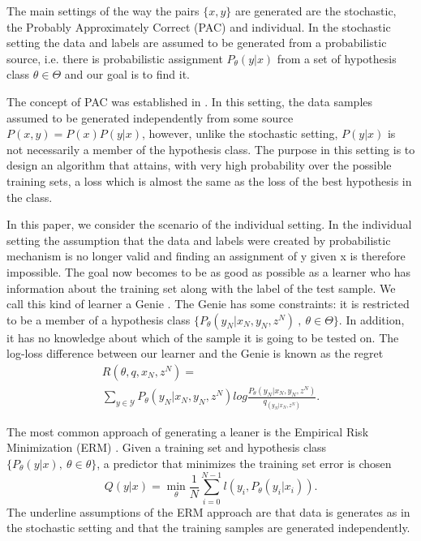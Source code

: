 \documentclass[conference,letterpaper]{IEEEtran}
\begin{document}
The main settings of the way the pairs $\{x,y\}$ are generated are the stochastic, the Probably Approximately Correct (PAC) and individual. 
In the stochastic setting the data and labels are assumed to be generated from a probabilistic source, i.e. there is probabilistic assignment $P_\theta(y|x)$ from a set of hypothesis class $\theta \in \Theta$ and our goal is to find it. 

The concept of PAC was established in  \cite{valiant1984theory}.
In this setting, the data samples assumed to be generated independently from some source $P(x,y)=P(x)P(y|x)$, however, unlike the stochastic setting, $P(y|x)$ is not necessarily a member of the hypothesis class.
The purpose in this setting is to design an algorithm that attains, with very high probability over the possible training sets, a loss which is almost the same as the loss of the best hypothesis in the class. 

In this paper, we consider the scenario of the individual setting. 
In the individual setting the assumption that the data and labels were created by probabilistic mechanism is no longer valid and finding an assignment of y given x is therefore impossible. 
The goal now becomes to be as good as possible as a learner who has information about the training set along with the label of the test sample. 
We call this kind of learner a Genie \cite{feder1992universal}. The Genie has some constraints: it is restricted to be a member of a hypothesis class $\{P_\theta(y_N|x_N,y_N,z^N)\ , \ \theta \in \Theta \}$.  
In addition, it has no knowledge about which of the sample it is going to be tested on. 
The log-loss difference between our learner and the Genie is known as the regret
\begin{multline} \label{eq:genie_regret}
R(\theta, q, x_N, z^N) = \\ \sum_{y \in \mathcal{Y}} P_\theta(y_N|x_N,y_N,z^N) log \frac{P_\theta(y_N|x_N,y_N,z^N)}{q_(y_N|x_N, z^N)}.
\end{multline}

The most common approach of generating a leaner is the Empirical Risk Minimization (ERM) \cite{vapnik1992principles}. 
Given a training set and hypothesis class $\{P_\theta(y|x),\ \theta \in \mathcal{\theta}\}$, a predictor that minimizes the training set error is chosen
\begin{equation}
Q(y|x) = \min_\theta \frac{1}{N}\sum_{i=0}^{N-1}  l(y_i,P_\theta(y_i|x_i)).
\end{equation}
The underline assumptions of the ERM approach are that data is generates as in the stochastic setting and that the training samples are generated independently.
\end{document}
